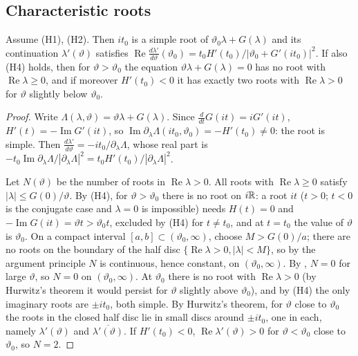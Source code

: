 \documentclass[11pt,a4paper]{report}
\newcommand{\vth}{\vartheta}
\begin{document}
\subsection{Characteristic roots}
\begin{proposition}\label{prop:roots}
Assume (H1), (H2). Then $it_0$ is a simple root of $\vth_0\lambda+G(\lambda)$ and its continuation $\lambda'(\vth)$ satisfies $\operatorname{Re}\frac{d\lambda'}{d\vth}(\vth_0)=t_0H'(t_0)/|\vth_0+G'(it_0)|^2$. If also (H4) holds, then for $\vth>\vth_0$ the equation $\vth\lambda+G(\lambda)=0$ has no root with $\operatorname{Re}\lambda\ge0$, and if moreover $H'(t_0)<0$ it has exactly two roots with $\operatorname{Re}\lambda>0$ for $\vth$ slightly below $\vth_0$.
\end{proposition}
\begin{proof}
Write $\Lambda(\lambda,\vth)=\vth\lambda+G(\lambda)$. Since $\frac{d}{dt}G(it)=iG'(it)$, $H'(t)=-\operatorname{Im}G'(it)$, so $\operatorname{Im}\partial_\lambda\Lambda(it_0,\vth_0)=-H'(t_0)\neq0$: the root is simple. Then $\frac{d\lambda'}{d\vth}=-it_0/\partial_\lambda\Lambda$, whose real part is $-t_0\operatorname{Im}\partial_\lambda\Lambda/|\partial_\lambda\Lambda|^2=t_0H'(t_0)/|\partial_\lambda\Lambda|^2$.

Let $N(\vth)$ be the number of roots in $\operatorname{Re}\lambda>0$. All roots with $\operatorname{Re}\lambda\ge0$ satisfy $|\lambda|\le G(0)/\vth$. By (H4), for $\vth>\vth_0$ there is no root on $i\mathbb{R}$: a root $it$ ($t>0$; $t<0$ is the conjugate case and $\lambda=0$ is impossible) needs $H(t)=0$ and $-\operatorname{Im}G(it)=\vth t>\vth_0t$, excluded by (H4) for $t\ne t_0$, and at $t=t_0$ the value of $\vth$ is $\vth_0$. On a compact interval $[a,b]\subset(\vth_0,\infty)$, choose $M>G(0)/a$; there are no roots on the boundary of the half disc $\{\operatorname{Re}\lambda>0,|\lambda|<M\}$, so by the argument principle $N$ is continuous, hence constant, on $(\vth_0,\infty)$. By , $N=0$ for large $\vth$, so $N=0$ on $(\vth_0,\infty)$. At $\vth_0$ there is no root with $\operatorname{Re}\lambda>0$ (by Hurwitz's theorem it would persist for $\vth$ slightly above $\vth_0$), and by (H4) the only imaginary roots are $\pm it_0$, both simple. By Hurwitz's theorem, for $\vth$ close to $\vth_0$ the roots in the closed half disc lie in small discs around $\pm it_0$, one in each, namely $\lambda'(\vth)$ and $\overline{\lambda'(\vth)}$. If $H'(t_0)<0$, $\operatorname{Re}\lambda'(\vth)>0$ for $\vth<\vth_0$ close to $\vth_0$, so $N=2$.
\end{proof}
\end{document}

